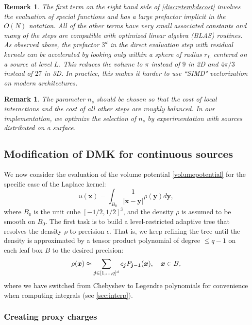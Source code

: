 \documentclass[final,letterpaper]{siamart171218}
\newtheorem{remark}[theorem]{Remark}
\newcommand{\be}{\begin{equation}}
\newcommand{\ee}{\end{equation}}
\newcommand{\x}{\boldsymbol{x}}
\newcommand{\y}{\boldsymbol{y}}
\newcommand{\bj}{\boldsymbol{j}}
\newcommand{\acron}{DMK }
\newcommand{\cR}{r}
\begin{document}
\begin{remark}
The first term on the right hand side of \cref{discretemkdscost} 
involves the evaluation of special functions and has a large prefactor implicit in the
$O(N)$ notation.  All of the other terms have very small
associated constants and many  of the steps are compatible with optimized linear
algebra (BLAS) routines.
As observed above, the prefactor $3^d$ 
in the direct evaluation step with residual kernels can be accelerated
by looking only within a sphere of radius $\cR_L$ centered on a source at level $L$.
This reduces the volume to $\pi$ instead of $9$ in 2D and $4\pi/3$ instead of $27$ in 3D.
In practice, this makes it harder to use ``SIMD" vectorization on modern
architectures.
\end{remark}

\begin{remark}
The parameter $n_s$ should be chosen so that the cost of local interactions 
and the cost of all other steps are roughly balanced.
In our implementation, we optimize the selection of $n_s$ by experimentation with 
sources distributed on a surface. 
\end{remark}



\subsection{Modification of \acron for continuous sources}\label{sec:continuoussources}

We now consider the evaluation of the volume potential 
\eqref{volumepotential} for the specific case of the Laplace kernel:
\be\label{laplacevolumepotential}
u(\x)=\int_{B_0} \frac{1}{|\x-\y|}\rho(\y)d\y,
\ee
where $B_0$ is the unit cube $[-1/2,1/2]^3$, and the density $\rho$ is assumed to be smooth
on $B_0$. 
The first task is to build a level-restricted adaptive tree that resolves the density $\rho$
to precision $\epsilon$. That is, we keep refining the tree until
the density is approximated by a tensor product
polynomial of degree $\le q-1$ on each leaf box $B$ to the desired precision:
\be \label{rhoapprox}
\rho(\x)\approx \sum_{\bj \in [1,\dots,q]^d} c_{\bj} 
 P_{\bj-{\bf 1}}(\x), \quad \x\in B,
\ee
where we have switched from Chebyshev to Legendre polynomials 
for convenience when computing integrals (see \cref{sec:interp}).

\subsubsection{Creating proxy charges}
\end{document}
